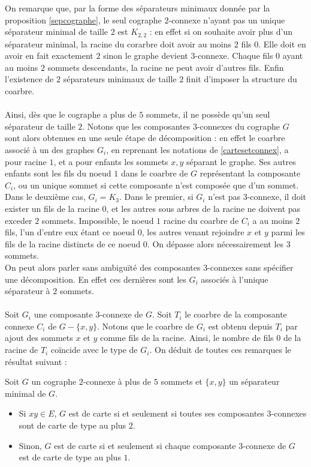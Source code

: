 \documentclass{scrartcl}
\begin{document}
\begin{flushleft}
On remarque que, par la forme des séparateurs minimaux donnée par la proposition \ref{sepcographe}, le seul cographe $2$-connexe n'ayant
pas un unique séparateur minimal de taille $2$ est $K_{2,2}$ : en effet si on souhaite avoir plus d'un séparateur minimal,
la racine du corarbre doit avoir au moins $2$ fils $0$. Elle doit en avoir en fait exactement $2$ sinon le graphe devient $3$-connexe.
Chaque fils $0$ ayant au moins $2$ sommets descendants, la racine ne peut avoir d'autres fils. Enfin l'existence de $2$ séparateurs minimaux
de taille $2$ finit d'imposer la structure du coarbre.
\\~\\
Ainsi, dès que le cographe a plus de $5$ sommets, il ne possède qu'un seul séparateur de taille $2$. Notons que les composantes $3$-connexes
du cographe $G$ sont alors obtenues en une seule étape de décomposition : en effet le coarbre associé à un des graphes $G_i$, en reprenant
les notations de \ref{cartesetconnex}, a pour racine $1$, et a pour enfants les sommets $x,y$ séparant le graphe.
Ses autres enfants sont les fils du noeud $1$ dans le coarbre de $G$ représentant la composante $C_i$, ou un unique sommet si
cette composante n'est composée que d'un sommet. Dans le deuxième cas, $G_i = K_3$. Dans le premier, si $G_i$ n'est pas $3$-connexe,
il doit exister un fils de la racine $0$, et les autres sous arbres de la racine ne doivent pas exceder $2$ sommets. Impossible,
le noeud $1$ racine du coarbre de $C_i$ a au moins $2$ fils, l'un d'entre eux étant ce noeud $0$, les autres venant rejoindre $x$ et $y$
parmi les fils de la racine distincts de ce noeud $0$. On dépasse alors nécessairement les $3$ sommets.\\
On peut alors parler sans ambiguïté des composantes $3$-connexes sans spécifier une décomposition. En effet ces dernières sont
les $G_i$ associés à l'unique séparateur à $2$ sommets.
\\~\\
Soit $G_i$ une composante $3$-connexe de $G$. Soit $T_i$ le coarbre de la composante connexe $C_i$ de $G - \{x,y\}$.
Notons que le coarbre de $G_i$ est obtenu depuis $T_i$ par ajout des sommets $x$ et $y$ comme fils de la racine. Ainsi, le nombre de fils
$0$ de la racine de $T_i$ coïncide avec le type de $G_i$. On déduit de toutes ces remarques le résultat suivant :

\begin{theorem}\label{cographe2conn}
    Soit $G$ un cographe $2$-connexe à plus de $5$ sommets et $\{x,y\}$ un séparateur minimal de $G$. 
    \begin{itemize}
        \item Si $xy \in E$, $G$ est de carte si et seulement si toutes ses composantes $3$-connexes sont de carte de type au plus $2$.
        \item Sinon, $G$ est de carte si et seulement si chaque composante $3$-connexe de $G$ est de carte de type au plus $1$.
    \end{itemize}
\end{theorem}


\end{flushleft}
\end{document}
